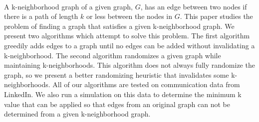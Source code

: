 
\\

\indent A k-neighborhood graph of a given graph, $G$, has an edge between two nodes if there is a path of length $k$ or less between the nodes in $G$. This paper studies the problem of finding a graph that satisfies a given k-neighborhood graph.  We present two algorithms which attempt to solve this problem. The first algorithm greedily adds edges to a graph until no edges can be added without invalidating a k-neighborhood. The second algorithm randomizes a given graph while maintaining k-neighborhoods. This algorithm does not always fully randomize the graph, so we present a better randomizing heuristic that invalidates some k-neighborhoods. All of our algorithms are tested on communication data from LinkedIn. We also run a simulation on this data to determine the minimum k value that can be applied so that edges from an original graph can not be determined from a given k-neighborhood graph.